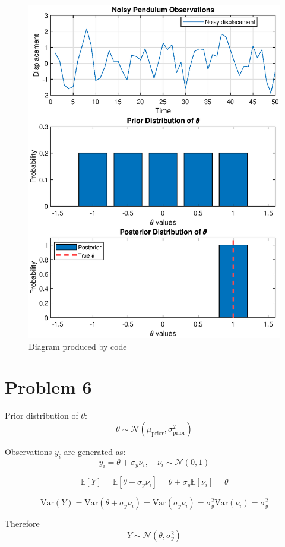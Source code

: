 \documentclass[12pt]{report}
\begin{document}
\begin{figure}[H]
    \centering
    \includegraphics[width=0.75\linewidth]{pendulum.eps}
    \caption{Diagram produced by code}
\end{figure}



\section*{Problem 6}


Prior distribution of \(\theta\):
  \[
  \theta \sim \mathcal{N}(\mu_{\text{prior}}, \sigma_{\text{prior}}^2)
  \]
  
Observations \(y_i\) are generated as:
  \[
  y_i = \theta + \sigma_y \nu_i, \quad \nu_i \sim \mathcal{N}(0,1)
  \]

\[
\mathbb{E}[Y] = \mathbb{E}[\theta + \sigma_y \nu_i] = \theta + \sigma_y \mathbb{E}[\nu_i] = \theta
\]

\[
\text{Var}(Y) = \text{Var}(\theta + \sigma_y \nu_i) = \text{Var}(\sigma_y \nu_i) = \sigma_y^2 \text{Var}(\nu_i) = \sigma_y^2
\]


Therefore 
\[
Y \sim \mathcal{N}(\theta, \sigma_y^2)
\]
\end{document}
